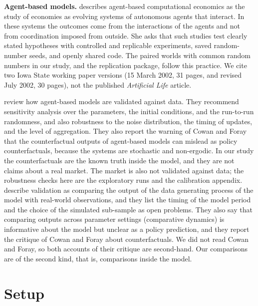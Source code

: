\documentclass[11pt]{article}
\begin{document}
\textbf{Agent-based models.} \citet{tesfatsion2002} describes agent-based computational economics as the study of economies as evolving systems of autonomous agents that interact. In these systems the outcomes come from the interactions of the agents and not from coordination imposed from outside. She asks that such studies test clearly stated hypotheses with controlled and replicable experiments, saved random-number seeds, and openly shared code. The paired worlds with common random numbers in our study, and the replication package, follow this practice. We cite two Iowa State working paper versions (15 March 2002, 31 pages, and revised July 2002, 30 pages), not the published \textit{Artificial Life} article.

\citet{windrum2007} review how agent-based models are validated against data. They recommend sensitivity analysis over the parameters, the initial conditions, and the run-to-run randomness, and also robustness to the noise distribution, the timing of updates, and the level of aggregation. They also report the warning of Cowan and Foray that the counterfactual outputs of agent-based models can mislead as policy counterfactuals, because the systems are stochastic and non-ergodic. In our study the counterfactuals are the known truth inside the model, and they are not claims about a real market. The market is also not validated against data; the robustness checks here are the exploratory runs and the calibration appendix. \citet{fagiolo2007} describe validation as comparing the output of the data generating process of the model with real-world observations, and they list the timing of the model period and the choice of the simulated sub-sample as open problems. They also say that comparing outputs across parameter settings (comparative dynamics) is informative about the model but unclear as a policy prediction, and they report the critique of Cowan and Foray about counterfactuals. We did not read Cowan and Foray, so both accounts of their critique are second-hand. Our comparisons are of the second kind, that is, comparisons inside the model.

\section{Setup}
\end{document}
